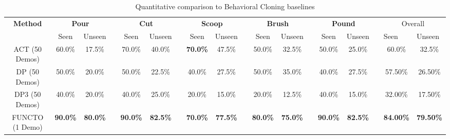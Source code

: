 \begin{table*}[th] \small
\centering
\caption{Quantitative comparison to Behavioral Cloning baselines}
  \vspace*{-0.1in}
\renewcommand\arraystretch{1.8}
\setlength\tabcolsep{3pt}%
\begin{tabular}{ccclcclcclcclcclcc}
\toprule
\multirow{2}{*}{\textbf{Method}} & \multicolumn{2}{c}{\textbf{Pour}} &  & \multicolumn{2}{c}{\textbf{Cut}} &  & \multicolumn{2}{c}{\textbf{Scoop}} &  & \multicolumn{2}{c}{\textbf{Brush}} &  & \multicolumn{2}{c}{\textbf{Pound}} &  & \multicolumn{2}{c}{Overall}                    \\ \cline{2-3} \cline{5-6} \cline{8-9} \cline{11-12} \cline{14-15} \cline{17-18} 
                                 & Seen           & Unseen           &  & Seen           & Unseen          &  & Seen            & Unseen           &  & Seen            & Unseen           &  & Seen            & Unseen           &  & \multicolumn{1}{l}{Seen} & \multicolumn{1}{l}{Unseen} \\ \midrule
ACT (50 Demos)                   & 60.0\%             & 17.5\%                 &  & 70.0\%             & 40.0\%                &  & \textbf{70.0\%}                & 47.5\%                 &  & 50.0\%                & 32.5\%                 &  & 50.0\%                & 25.0\%                &  & 60.0\%                        & 32.5\%                           \\
DP (50 Demos)                    & 50.0\%              & 20.0\%                &  & 50.0\%             & 22.5\%                &  & 40.0\%                & 27.5\%                &  & 50.0\%               & 35.0\%                 &  & 40.0\%               & 27.5\%                &  & 57.50\%                        & 26.50\%                            \\
DP3 (50 Demos)                   & 40.0\%              & 20.0\%                 &  & 40.0\%               & 25.0\%               &  & 20.0\%                & 15.0\%                 &  & 20.0\%               & 12.5\%                &  & 40.0\%              & 15.0\%                 &  & 32.00\%                          & 17.50\%                            \\ 
FUNCTO (1 Demo)                  & \textbf{90.0\%}               & \textbf{80.0\%}                 &  & \textbf{90.0\%}               & \textbf{82.5\%}                &  & \textbf{70.0\%}                & \textbf{77.5\%}                 &  & \textbf{80.0\%}                & \textbf{75.0\%}                 &  & \textbf{90.0\%}                & \textbf{82.5\%}                 &  & \textbf{84.00\%}                          & \textbf{79.50\%}                            \\ \bottomrule
\end{tabular}
  \vspace*{-0.2in}
\label{tab:bc_exp}
\end{table*}



